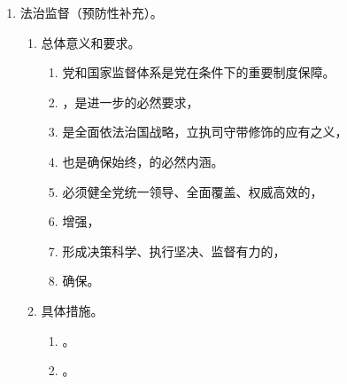\begin{enumerate}
\begin{enumerate}
          \item 具体措施。
                人民是依法治国的，
                三治的建设构成，
                法治事业的顺利发展，的参与和支持。
                。
                \begin{enumerate}
                  \item 推动全社会。加强，引导民众法治意识和法治观念。
                  \item 推进。综合利用各种手段，广泛发挥方面的积极价值。
                  \item 建设。推进覆盖城乡居民的建设，加强。
                  \item 健全机制。引导民众，将。
                \end{enumerate}
        \end{enumerate}
  \item 法治监督（预防性补充）。
        \begin{enumerate}
          \item 总体意义和要求。
                \begin{enumerate}
                  \item 党和国家监督体系是党在条件下的重要制度保障。
                  \item {}，是进一步的必然要求，
                  \item 是全面依法治国战略，立执司守带修饰的应有之义，
                  \item 也是确保始终，的必然内涵。
                  \item 必须健全党统一领导、全面覆盖、权威高效的，
                  \item 增强，
                  \item 形成决策科学、执行坚决、监督有力的，
                  \item 确保。
                \end{enumerate}
          \item 具体措施。
                \begin{enumerate}
                  \item {}。
                  \item {}。
                \end{enumerate}
        \end{enumerate}
\end{enumerate}